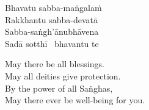 \begin{pali-hang-continued}
  Bhavatu sabba-maṅgalaṁ\\
  Rakkhantu sabba-devatā\\
  Sabba-saṅgh'ānubhāvena\\
  Sadā sotthī \breathmark\ bhavantu te
\end{pali-hang-continued}

\begin{english-verses}
  May there be all blessings.\\
  May all deities give protection.\\
  By the power of all Saṅghas,\\
  May there ever be well-being for you.
\end{english-verses}

\suttaRef{[Trad]}

